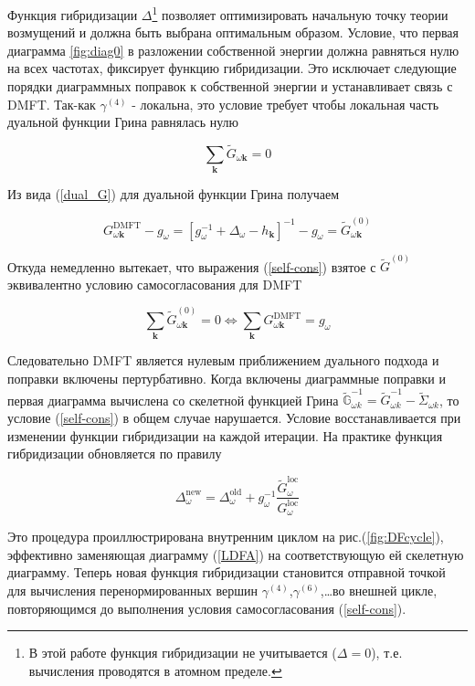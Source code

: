 \documentclass[11pt,a4paper]{report}
\begin{document}
Функция гибридизации $\Delta$\footnote{В этой работе функция гибридизации не учитывается ($\Delta = 0$), т.е. вычисления проводятся в атомном пределе.}
позволяет оптимизировать начальную точку теории возмущений и должна быть выбрана оптимальным образом. Условие, что первая диаграмма \ref{fig:diag0} в разложении собственной энергии должна
равняться нулю на всех частотах, фиксирует функцию гибридизации. Это исключает следующие порядки диаграммных поправок к собственной энергии и устанавливает связь с DMFT. Так-как $\gamma^{(4)}$ - 
локальна, это условие требует чтобы локальная часть дуальной функции Грина равнялась нулю

\begin{equation}
\label{self-cons}
 \sum_\mathbf{k} \tilde{G}_{\omega\mathbf{k}} = 0
\end{equation}

Из вида (\ref{dual_G}) для дуальной функции Грина получаем

\begin{equation}
 G^{\text{DMFT}}_{\omega\mathbf{k}} - g_\omega = \left[g_\omega^{-1}+\Delta_\omega-h_\mathbf{k}\right]^{-1}-g_\omega = \tilde{G}^{(0)}_{\omega\mathbf{k}}
\end{equation}

Откуда немедленно вытекает, что выражения (\ref{self-cons}) взятое с $\tilde{G}^{(0)}$ эквивалентно условию самосогласования для DMFT 

\begin{equation}
 \sum_{\mathbf{k}} \tilde{G}^{(0)}_{\omega\mathbf{k}} = 0 \Longleftrightarrow \sum_{\mathbf{k}} G^{\text{DMFT}}_{\omega\mathbf{k}} = g_\omega
\end{equation}

Следовательно DMFT является нулевым приближением дуального подхода и поправки включены пертурбативно. Когда включены диаграммные поправки и первая диаграмма вычислена со скелетной функцией Грина
$\tilde{\mathbb{G}}^{-1}_{\omega k} = \tilde{G}^{-1}_{\omega k} - \tilde{\Sigma}_{\omega k}$,
то условие (\ref{self-cons}) в общем случае нарушается. Условие восстанавливается при изменении функции гибридизации на каждой итерации. На практике функция гибридизации обновляется по правилу

\begin{equation}
 \Delta^{\text{new}}_\omega = \Delta^{\text{old}}_\omega + g_\omega^{-1}\frac{\tilde{G}^{\text{loc}}_\omega}{G^{\text{loc}}_\omega}
\end{equation}

Это процедура проиллюстрирована внутренним циклом на рис.(\ref{fig:DFcycle}), эффективно заменяющая диаграмму (\ref{LDFA}) на соответствующую ей скелетную диаграмму. 
Теперь новая функция гибридизации становится отправной точкой для вычисления перенормированных вершин $\gamma^{(4)}$,$\gamma^{(6)}$,\dots во внешней цикле, повторяющимся до выполнения условия
самосогласования (\ref{self-cons}).
\end{document}
